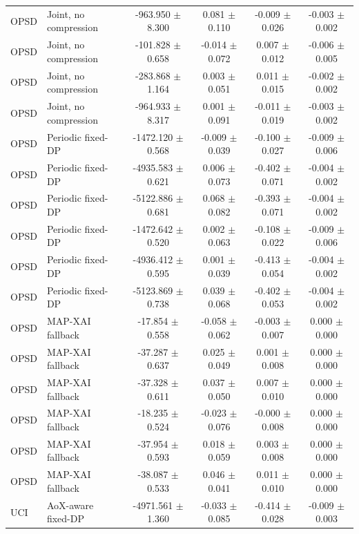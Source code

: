 \begin{table}[t]
\begin{tabular}{llcccc}
OPSD & Joint, no compression & -963.950 $\pm$ 8.300 & 0.081 $\pm$ 0.110 & -0.009 $\pm$ 0.026 & -0.003 $\pm$ 0.002 \\
OPSD & Joint, no compression & -101.828 $\pm$ 0.658 & -0.014 $\pm$ 0.072 & 0.007 $\pm$ 0.012 & -0.006 $\pm$ 0.005 \\
OPSD & Joint, no compression & -283.868 $\pm$ 1.164 & 0.003 $\pm$ 0.051 & 0.011 $\pm$ 0.015 & -0.002 $\pm$ 0.002 \\
OPSD & Joint, no compression & -964.933 $\pm$ 8.317 & 0.001 $\pm$ 0.091 & -0.011 $\pm$ 0.019 & -0.003 $\pm$ 0.002 \\
OPSD & Periodic fixed-DP & -1472.120 $\pm$ 0.568 & -0.009 $\pm$ 0.039 & -0.100 $\pm$ 0.027 & -0.009 $\pm$ 0.006 \\
OPSD & Periodic fixed-DP & -4935.583 $\pm$ 0.621 & 0.006 $\pm$ 0.073 & -0.402 $\pm$ 0.071 & -0.004 $\pm$ 0.002 \\
OPSD & Periodic fixed-DP & -5122.886 $\pm$ 0.681 & 0.068 $\pm$ 0.082 & -0.393 $\pm$ 0.071 & -0.004 $\pm$ 0.002 \\
OPSD & Periodic fixed-DP & -1472.642 $\pm$ 0.520 & 0.002 $\pm$ 0.063 & -0.108 $\pm$ 0.022 & -0.009 $\pm$ 0.006 \\
OPSD & Periodic fixed-DP & -4936.412 $\pm$ 0.595 & 0.001 $\pm$ 0.039 & -0.413 $\pm$ 0.054 & -0.004 $\pm$ 0.002 \\
OPSD & Periodic fixed-DP & -5123.869 $\pm$ 0.738 & 0.039 $\pm$ 0.068 & -0.402 $\pm$ 0.053 & -0.004 $\pm$ 0.002 \\
OPSD & MAP-XAI fallback & -17.854 $\pm$ 0.558 & -0.058 $\pm$ 0.062 & -0.003 $\pm$ 0.007 & 0.000 $\pm$ 0.000 \\
OPSD & MAP-XAI fallback & -37.287 $\pm$ 0.637 & 0.025 $\pm$ 0.049 & 0.001 $\pm$ 0.008 & 0.000 $\pm$ 0.000 \\
OPSD & MAP-XAI fallback & -37.328 $\pm$ 0.611 & 0.037 $\pm$ 0.050 & 0.007 $\pm$ 0.010 & 0.000 $\pm$ 0.000 \\
OPSD & MAP-XAI fallback & -18.235 $\pm$ 0.524 & -0.023 $\pm$ 0.076 & -0.000 $\pm$ 0.008 & 0.000 $\pm$ 0.000 \\
OPSD & MAP-XAI fallback & -37.954 $\pm$ 0.593 & 0.018 $\pm$ 0.059 & 0.003 $\pm$ 0.008 & 0.000 $\pm$ 0.000 \\
OPSD & MAP-XAI fallback & -38.087 $\pm$ 0.533 & 0.046 $\pm$ 0.041 & 0.011 $\pm$ 0.010 & 0.000 $\pm$ 0.000 \\
UCI & AoX-aware fixed-DP & -4971.561 $\pm$ 1.360 & -0.033 $\pm$ 0.085 & -0.414 $\pm$ 0.028 & -0.009 $\pm$ 0.003 \\

\end{tabular}
\end{table}
